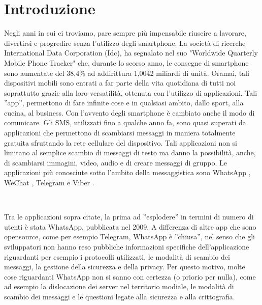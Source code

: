 \documentclass[a4paper,11pt]{book}
\begin{document}
\begin{frontespizio}
\end{frontespizio}


\tableofcontents

\chapter{Introduzione}
Negli anni in cui ci troviamo, pare sempre pi\`u impensabile riuscire a lavorare, divertirsi e progredire senza l'utilizzo degli smartphone. La società di ricerche International Data Corporation (Idc), ha segnalato nel suo "Worldwide Quarterly Mobile Phone Tracker" che, durante lo scorso anno, le consegne di smartphone sono aumentate del 38,4\% ad addirittura 1,0042 miliardi di unità.
Oramai, tali dispositivi mobili sono entrati a far parte della vita quotidiana di tutti noi soprattutto grazie alla loro versatilit\`a, ottenuta con l'utilizzo di applicazioni.
Tali ''app'', permettono di fare infinite cose e in qualsiasi ambito, dallo sport, alla cucina, al business. Con l'avvento degli smartphone \`e cambiato anche il modo di comunicare.
Gli SMS, utilizzati fino a qualche anno fa, sono quasi superati da applicazioni che permettono di scambiarsi messaggi in maniera totalmente gratuita sfruttando la rete cellulare del dispositivo. Tali applicazioni non si limitano al semplice scambio di messaggi di testo ma danno la possibilit\`a, anche, di scambiarsi immagini, video, audio e di creare messaggi di gruppo.
Le applicazioni pi\`u conosciute sotto l'ambito della messaggistica sono WhatsApp \cite{rif1}, WeChat \cite{rif2}, Telegram \cite{rif3} e Viber \cite{rif4}.

~

Tra le applicazioni sopra citate, la prima ad ''esplodere'' in termini di numero di utenti \`e stata WhatsApp, pubblicata nel 2009. A differenza di altre app che sono opensource, come per esempio Telegram, WhatsApp \`e ''chiusa'', nel senso che gli sviluppatori non hanno reso pubbliche informazioni specifiche dell'applicazione riguardanti per esempio i protocolli utilizzati, le modalit\`a di scambio dei messaggi, la gestione della sicurezza e della privacy.
Per questo motivo, molte cose riguardanti WhatsApp non si sanno con certezza (o priorio per nulla), come ad esempio la dislocazione dei server nel territorio modiale, le modalit\`a di scambio dei messaggi e le questioni legate alla sicurezza e alla crittografia.
\end{document}

